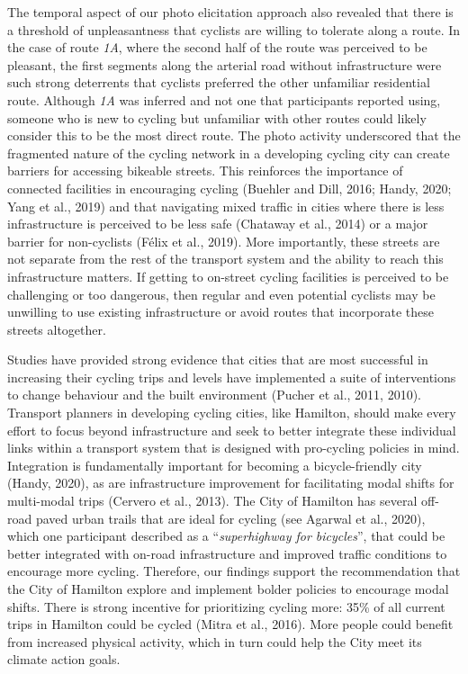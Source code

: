 \documentclass[]{elsarticle} %
\begin{document}
The temporal aspect of our photo elicitation approach also revealed that
there is a threshold of unpleasantness that cyclists are willing to
tolerate along a route. In the case of route \emph{1A}, where the second
half of the route was perceived to be pleasant, the first segments along
the arterial road without infrastructure were such strong deterrents
that cyclists preferred the other unfamiliar residential route. Although
\emph{1A} was inferred and not one that participants reported using,
someone who is new to cycling but unfamiliar with other routes could
likely consider this to be the most direct route. The photo activity
underscored that the fragmented nature of the cycling network in a
developing cycling city can create barriers for accessing bikeable
streets. This reinforces the importance of connected facilities in
encouraging cycling (Buehler and Dill, 2016; Handy, 2020; Yang et al.,
2019) and that navigating mixed traffic in cities where there is less
infrastructure is perceived to be less safe (Chataway et al., 2014) or a
major barrier for non-cyclists (Félix et al., 2019). More importantly,
these streets are not separate from the rest of the transport system and
the ability to reach this infrastructure matters. If getting to
on-street cycling facilities is perceived to be challenging or too
dangerous, then regular and even potential cyclists may be unwilling to
use existing infrastructure or avoid routes that incorporate these
streets altogether.

Studies have provided strong evidence that cities that are most
successful in increasing their cycling trips and levels have implemented
a suite of interventions to change behaviour and the built environment
(Pucher et al., 2011, 2010). Transport planners in developing cycling
cities, like Hamilton, should make every effort to focus beyond
infrastructure and seek to better integrate these individual links
within a transport system that is designed with pro-cycling policies in
mind. Integration is fundamentally important for becoming a
bicycle-friendly city (Handy, 2020), as are infrastructure improvement
for facilitating modal shifts for multi-modal trips (Cervero et al.,
2013). The City of Hamilton has several off-road paved urban trails that
are ideal for cycling (see Agarwal et al., 2020), which one participant
described as a ``\emph{superhighway for bicycles}'', that could be
better integrated with on-road infrastructure and improved traffic
conditions to encourage more cycling. Therefore, our findings support
the recommendation that the City of Hamilton explore and implement
bolder policies to encourage modal shifts. There is strong incentive for
prioritizing cycling more: 35\% of all current trips in Hamilton could
be cycled (Mitra et al., 2016). More people could benefit from increased
physical activity, which in turn could help the City meet its climate
action goals.
\end{document}
